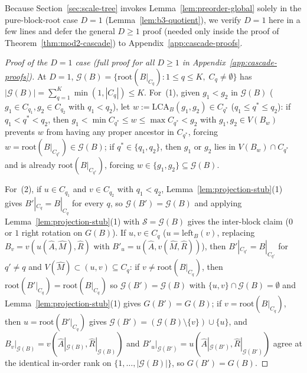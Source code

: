 \documentclass[11pt]{article}
\theoremstyle{definition}
\theoremstyle{remark}
\newcommand{\LCA}{\mathrm{LCA}}
\begin{document}
Because Section~\ref{sec:scale-tree} invokes Lemma~\ref{lem:preorder-global} solely in the pure-block-root case $D = 1$ (Lemma~\ref{lem:b3-quotient}), we verify $D = 1$ here in a few lines and defer the general $D \ge 1$ proof (needed only inside the proof of Theorem~\ref{thm:mod2-cascade}) to Appendix~\ref{app:cascade-proofs}.

\begin{proof}[Proof of the $D = 1$ case (full proof for all $D \ge 1$ in Appendix~\ref{app:cascade-proofs})]
At $D = 1$, $\mathcal{G}(B) = \{\mathrm{root}(B|_{C_q}) : 1 \le q \le K,\; C_q \ne \emptyset\}$ has $|\mathcal{G}(B)| = \sum_{q=1}^K \min(1, |C_q|) \le K$. For~(1), given $g_1 < g_2$ in $\mathcal{G}(B)$ ($g_1 \in C_{q_1}, g_2 \in C_{q_2}$ with $q_1 < q_2$), let $w := \LCA_B(g_1, g_2) \in C_{q^*}$ ($q_1 \le q^* \le q_2$): if $q_1 < q^* < q_2$, then $g_1 < \min C_{q^*} \le w \le \max C_{q^*} < g_2$ with $g_1, g_2 \in V(B_w)$ prevents $w$ from having any proper ancestor in $C_{q^*}$, forcing $w = \mathrm{root}(B|_{C_{q^*}}) \in \mathcal{G}(B)$; if $q^* \in \{q_1, q_2\}$, then $g_1$ or $g_2$ lies in $V(B_w) \cap C_{q^*}$ and is already $\mathrm{root}(B|_{C_{q^*}})$, forcing $w \in \{g_1, g_2\} \subseteq \mathcal{G}(B)$.

For~(2), if $u \in C_{q_1}$ and $v \in C_{q_2}$ with $q_1 < q_2$, Lemma~\ref{lem:projection-stub}(1) gives $B'|_{C_q} = B|_{C_q}$ for every $q$, so $\mathcal{G}(B') = \mathcal{G}(B)$ and applying Lemma~\ref{lem:projection-stub}(1) with $\mathcal{S} = \mathcal{G}(B)$ gives the inter-block claim ($0$ or $1$ right rotation on $G(B)$). If $u, v \in C_q$ ($u = \mathrm{left}_B(v)$, replacing $B_v = v(u(\widehat{A}, \widehat{M}), \widehat{R})$ with $B'_u = u(\widehat{A}, v(\widehat{M}, \widehat{R}))$), then $B'|_{C_{q'}} = B|_{C_{q'}}$ for $q' \ne q$ and $V(\widehat{M}) \subset (u, v) \subseteq C_q$: if $v \ne \mathrm{root}(B|_{C_q})$, then $\mathrm{root}(B'|_{C_q}) = \mathrm{root}(B|_{C_q})$ so $\mathcal{G}(B') = \mathcal{G}(B)$ with $\{u, v\} \cap \mathcal{G}(B) = \emptyset$ and Lemma~\ref{lem:projection-stub}(1) gives $G(B') = G(B)$; if $v = \mathrm{root}(B|_{C_q})$, then $u = \mathrm{root}(B'|_{C_q})$ gives $\mathcal{G}(B') = (\mathcal{G}(B) \setminus \{v\}) \cup \{u\}$, and $B_v|_{\mathcal{G}(B)} = v(\widehat{A}|_{\mathcal{G}(B)}, \widehat{R}|_{\mathcal{G}(B)})$ and $B'_u|_{\mathcal{G}(B')} = u(\widehat{A}|_{\mathcal{G}(B')}, \widehat{R}|_{\mathcal{G}(B')})$ agree at the identical in-order rank on $\{1, \dots, |\mathcal{G}(B)|\}$, so $G(B') = G(B)$.
\end{proof}
\end{document}
